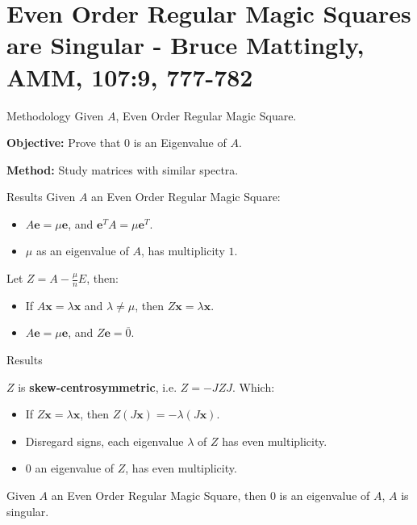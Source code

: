 \documentclass[10pt]{beamer}
\begin{document}
\section{Even Order Regular Magic Squares are Singular - Bruce Mattingly, AMM, 107:9, 777-782} %

\begin{frame}{Methodology}
    Given $A$, Even Order Regular Magic Square.

    \textbf{Objective:} Prove that $0$ is an Eigenvalue of $A$.

    \textbf{Method:} Study matrices with similar spectra.
\end{frame}

\begin{frame}{Results}
    Given $A$ an Even Order Regular Magic Square:
    \begin{theorem}
        \begin{itemize}
            \item $A\textbf{e} = \mu\textbf{e}$, and $\textbf{e}^TA = \mu\textbf{e}^T$.
            \item $\mu$ as an eigenvalue of $A$, has multiplicity $1$.
        \end{itemize}
    \end{theorem}

    \hfil

    \begin{theorem}
        Let $Z=A-\frac{\mu}{n}E$, then:
        \begin{itemize}
            \item If $A\textbf{x}=\lambda\textbf{x}$ and $\lambda\neq \mu$, then $Z\textbf{x}=\lambda\textbf{x}$.
            \item $A\textbf{e} = \mu\textbf{e}$, and $Z\textbf{e}=\overline{0}$.
        \end{itemize}
    \end{theorem}
\end{frame}

\begin{frame}{Results}
    \begin{theorem}
        $Z$ is \textbf{skew-centrosymmetric}, i.e. $Z=-JZJ$. Which:
        \begin{itemize}
            \item If $Z\textbf{x}=\lambda\textbf{x}$, then $Z(J\textbf{x}) = -\lambda(J\textbf{x})$.
            \item Disregard signs, each eigenvalue $\lambda$ of $Z$ has even multiplicity.
            \item $0$ an eigenvalue of $Z$, has even multiplicity.
        \end{itemize}
    \end{theorem}
    
    \hfil

    \begin{theorem}
        Given $A$ an Even Order Regular Magic Square, then $0$ is an eigenvalue of $A$, $A$ is singular.
    \end{theorem}
\end{frame}
\end{document}
